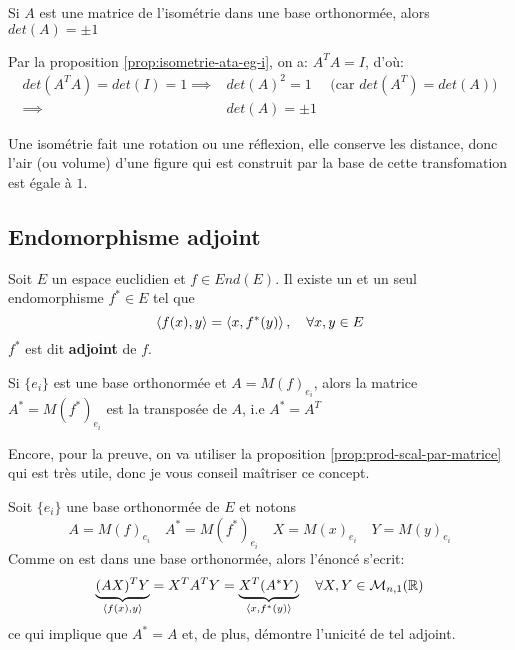 \begin{prop}
   Si $A$ est une matrice de l'isométrie dans une base orthonormée, alors  $det(A) = \pm 1$ 
\end{prop}
\begin{preuve}
    Par la proposition \ref{prop:isometrie-ata-eg-i}, on a: $A^TA = I$, d'où:
     \begin{align*}
         det(A^TA) = det(I) = 1 \implies& det(A)^2 = 1 \quad \text{ (car }  det(A^T) = det(A) \text{)}\\
                                \implies& det(A) = \pm 1
    \end{align*}
\end{preuve}
\begin{intuition}
   Une isométrie fait une rotation ou une réflexion, elle conserve les distance, donc l'air (ou volume) d'une figure qui est construit par la base de cette transfomation est égale à $1$. 
\end{intuition}

\subsection{Endomorphisme adjoint}
\begin{prop}
   Soit $E$ un espace euclidien et  $f \in End(E)$. Il existe un et un seul endomorphisme  $f^* \in E$ tel que
   \[
       \left\langle f(x), y \right\rangle = \left\langle x, f^*(y) \right\rangle, \quad \forall x, y \in E
   \] 
   $f^*$ est dit  \textbf{adjoint} de $f$.
   \par
   Si  $\{e_i\}$ est une base orthonormée et  $A = M(f)_{e_i}$, alors la matrice $A^* = M(f^*)_{e_i}$ est la transposée de $A$, i.e  $A^* = A^T$
\end{prop}
\begin{preuve}
    Encore, pour la preuve, on va utiliser la proposition \ref{prop:prod-scal-par-matrice} qui est très utile, donc je vous conseil maîtriser ce concept.
    \par
    Soit $\{e_i\}$ une base orthonormée de $E$ et notons
     \[
    A = M(f)_{e_i} \quad A^* = M(f^*)_{e_i} \quad X = M(x)_{e_i} \quad Y = M(y)_{e_i}
    \] 
    Comme on est dans une base orthonormée, alors l'énoncé s'ecrit:
    \[
        \underbrace{(AX)^TY}_{\left\langle f(x),y \right\rangle} = X^TA^TY = \underbrace{X^T(A^*Y)}_{\left\langle x, f^*(y) \right\rangle} \quad \forall X, Y \in \mathcal{M}_{n, 1}(\mathbb{R})
    \] 
    ce qui implique que $A^* = A$ et, de plus, démontre l'unicité de tel adjoint.
\end{preuve}


